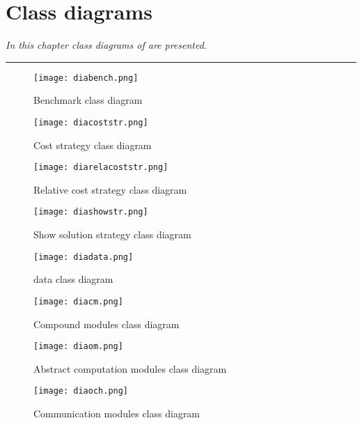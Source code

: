 \chapter{\posl{} Class diagrams}
\label{app:sgp}
\textit{In this chapter class diagrams of \posl{} are presented.}
\vfill
\newpage


\noindent\rule[2pt]{\textwidth}{0.8pt}

\clearpage


\begin{figure}
	\centering
	\texttt{[image: diabench.png]}
	\caption[]{Benchmark class diagram}\label{diag:bench}
\end{figure}

\begin{figure}
	\centering
	\texttt{[image: diacoststr.png]}
	\caption[]{Cost strategy class diagram}\label{diag:coststr}
\end{figure}

\begin{figure}
	\centering
	\texttt{[image: diarelacoststr.png]}
	\caption[]{Relative cost strategy class diagram}\label{diag:relacoststr}
\end{figure}

\begin{figure}
	\centering
	\texttt{[image: diashowstr.png]}
	\caption[]{Show solution strategy class diagram}\label{diag:showstr}
\end{figure}

\begin{figure}
	\centering
	\texttt{[image: diadata.png]}
	\caption[]{\posl{} data class diagram}\label{diag:data}
\end{figure}

\begin{figure}
	\centering
	\texttt{[image: diacm.png]}
	\caption[]{Compound modules class diagram}\label{diag:cm}
\end{figure}

\begin{figure}
	\centering
	\texttt{[image: diaom.png]}
	\caption[]{Abstract computation modules class diagram}\label{diag:om}
\end{figure}

\begin{figure}
	\centering
	\texttt{[image: diaoch.png]}
	\caption[]{Communication modules class diagram}\label{diag:opch}
\end{figure}